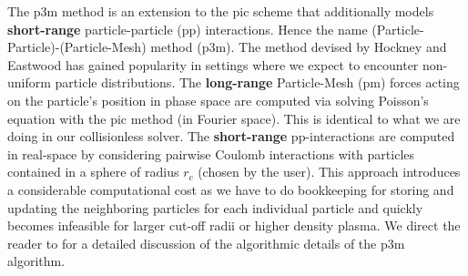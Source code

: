 The \gls{p3m} method is an extension to the \gls{pic} scheme that additionally models \textbf{short-range} 
particle-particle (\gls{pp}) interactions. Hence the name (Particle-Particle)-(Particle-Mesh) method
(\gls{p3m}).
The method devised by Hockney and Eastwood \cite{Hockney2021} has gained popularity in settings
where we expect to encounter non-uniform particle distributions.
The \textbf{long-range} Particle-Mesh (\gls{pm}) forces acting on the particle's position in phase space are computed via solving
Poisson's equation with the \gls{pic} method (in Fourier space). This is identical to what we are doing in our collisionless solver.
The \textbf{short-range} \gls{pp}-interactions are computed in real-space by considering pairwise Coulomb interactions
with particles contained in a sphere of radius $r_c$ (chosen by the user).
This approach introduces a considerable computational cost as we have to do bookkeeping for storing
and updating the neighboring particles for each individual particle and quickly becomes infeasible
for larger cut-off radii or higher density plasma.
We direct the reader to \cite{Hockney2021} for a detailed discussion of the algorithmic details of the
\gls{p3m} algorithm.

